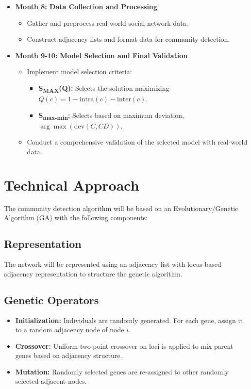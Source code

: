 \documentclass{article}
\begin{document}
\begin{itemize}
    \item \textbf{Month 8: Data Collection and Processing}
    \begin{itemize}
        \item Gather and preprocess real-world social network data.
        \item Construct adjacency lists and format data for community detection.
    \end{itemize}

    \item \textbf{Month 9-10: Model Selection and Final Validation}
    \begin{itemize}
        \item Implement model selection criteria:
        \begin{itemize}
            \item \textbf{S\textsubscript{MAX}(Q):} Selects the solution maximizing \( Q(c) = 1 - \text{intra}(c) - \text{inter}(c) \).
            \item \textbf{S\textsubscript{max-min}:} Selects based on maximum deviation, \( \arg\max(\text{dev}(C, CD)) \).
        \end{itemize}
        \item Conduct a comprehensive validation of the selected model with real-world data.
    \end{itemize}
\end{itemize}

\section{Technical Approach}
The community detection algorithm will be based on an Evolutionary/Genetic Algorithm (GA) with the following components:

\subsection{Representation}
The network will be represented using an adjacency list with locus-based adjacency representation to structure the genetic algorithm.

\subsection{Genetic Operators}
\begin{itemize}
    \item \textbf{Initialization:} Individuals are randomly generated. For each gene, assign it to a random adjacency node of node \( i \).
    \item \textbf{Crossover:} Uniform two-point crossover on loci is applied to mix parent genes based on adjacency structure.
    \item \textbf{Mutation:} Randomly selected genes are re-assigned to other randomly selected adjacent nodes.
\end{itemize}
\end{document}
